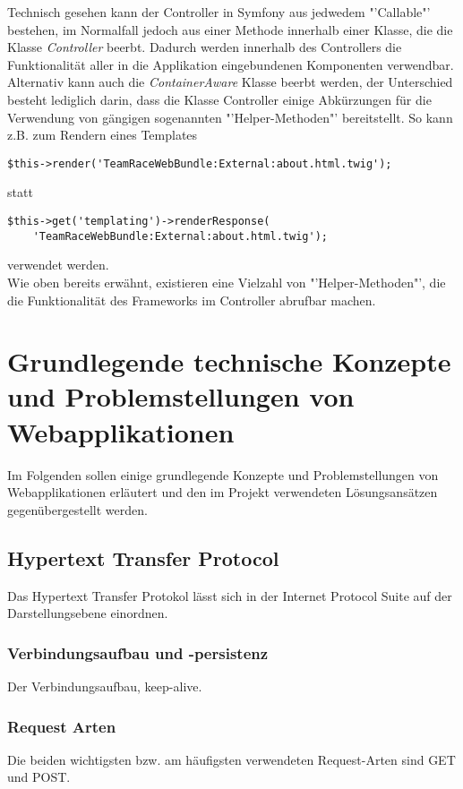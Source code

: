 \documentclass[12pt]{report}
\begin{document}
Technisch gesehen kann der Controller in Symfony aus jedwedem "'Callable"' bestehen, im Normalfall jedoch aus einer Methode innerhalb einer Klasse, die die Klasse \emph{Controller} beerbt. Dadurch werden innerhalb des Controllers die Funktionalität aller in die Applikation eingebundenen Komponenten verwendbar. Alternativ kann auch die \emph{ContainerAware} Klasse beerbt werden, der Unterschied besteht lediglich darin, dass die Klasse Controller einige Abkürzungen für die Verwendung von gängigen sogenannten "'Helper-Methoden"' bereitstellt. So kann z.B. zum Rendern eines Templates

\begin{lstlisting}
$this->render('TeamRaceWebBundle:External:about.html.twig');
\end{lstlisting}
statt 
\begin{lstlisting}
$this->get('templating')->renderResponse(
	'TeamRaceWebBundle:External:about.html.twig');
\end{lstlisting}
verwendet werden.\\

Wie oben bereits erwähnt, existieren eine Vielzahl von "'Helper-Methoden"', die die Funktionalität des Frameworks im Controller abrufbar machen.



\chapter{Grundlegende technische Konzepte und Problemstellungen von Webapplikationen}

Im Folgenden sollen einige grundlegende Konzepte und Problemstellungen von Webapplikationen erläutert und den im Projekt verwendeten Lösungsansätzen gegenübergestellt werden. 

\section{Hypertext Transfer Protocol}
Das Hypertext Transfer Protokol lässt sich in der Internet Protocol Suite auf der Darstellungsebene einordnen.\cite{wiki:HTTP}
\subsection{Verbindungsaufbau und -persistenz}
Der Verbindungsaufbau, keep-alive.
\subsection{Request Arten}
Die beiden wichtigsten bzw. am häufigsten verwendeten Request-Arten sind GET und POST.
\end{document}
